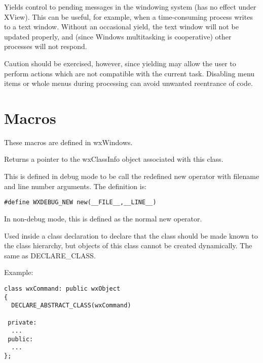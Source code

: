 

Yields control to pending messages in the windowing system (has no
effect under XView). This can be useful, for example, when a
time-consuming process writes to a text window. Without an occasional
yield, the text window will not be updated properly, and (since Windows
multitasking is cooperative) other processes will not respond.

Caution should be exercised, however, since yielding may allow the
user to perform actions which are not compatible with the current task.
Disabling menu items or whole menus during processing can avoid unwanted
reentrance of code.

\section{Macros}\label{macros}

These macros are defined in wxWindows.

\label{classinfo}


Returns a pointer to the wxClassInfo object associated with this class.

\label{debugnew}


This is defined in debug mode to be call the redefined new operator
with filename and line number arguments. The definition is:

\begin{verbatim}
#define WXDEBUG_NEW new(__FILE__,__LINE__)
\end{verbatim}

In non-debug mode, this is defined as the normal new operator.



Used inside a class declaration to declare that the class should be
made known to the class hierarchy, but objects of this class cannot be created
dynamically. The same as DECLARE\_CLASS.

Example:

\begin{verbatim}
class wxCommand: public wxObject
{
  DECLARE_ABSTRACT_CLASS(wxCommand)

 private:
  ...
 public:
  ...
};
\end{verbatim}

